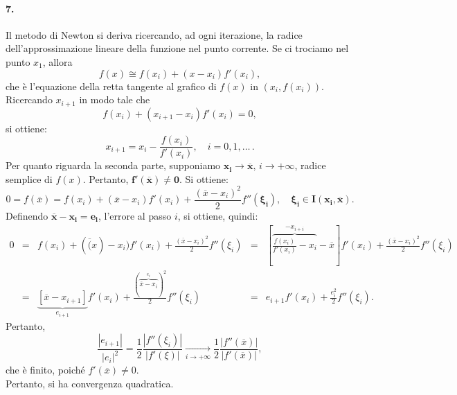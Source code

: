 \paragraph{7.} Il metodo di Newton si deriva ricercando, ad ogni iterazione, la radice dell'approssimazione lineare della funzione nel punto corrente. Se ci trociamo nel punto $x_1$, allora
\begin{equation*}
	f(x)\cong f(x_i)+(x-x_i)f'(x_i),
\end{equation*}
che è l'equazione della retta tangente al grafico di $f(x)$ in $(x_i, f(x_i))$.\\
Ricercando $x_{i+1}$ in modo tale che
\begin{equation*}
	f(x_i)+(x_{i+1}-x_i)f'(x_i)=0,
\end{equation*}
si ottiene:
\begin{equation*}
	x_{i+1}=x_i-\frac{f(x_i)}{f'(x_i)},\quad i=0,1,\hdots\, .
\end{equation*}
Per quanto riguarda la seconda parte, supponiamo $\boldsymbol{x_i\rightarrow\overline{x}},\, i\rightarrow +\infty$, radice semplice di $f(x)$. Pertanto, $\boldsymbol{f'(\overline{x})\neq 0}$. Si ottiene:
\begin{equation*}
	0=f(\overline{x})=f(x_i)+(\overline{x}-x_i)f'(x_i)+\frac{(\overline{x}-x_i)^2}{2}f''(\boldsymbol{\xi_i}),\quad \boldsymbol{\xi_i\in I(x_i,\overline{x})}.
\end{equation*}
Definendo $\boldsymbol{\overline{x}-x_i = e_i}$, l'errore al passo $i$, si ottiene, quindi:
\begin{equation*}
	\begin{matrix}
		0 &=& f(x_i)+(\overline(x)-x_i)f'(x_i)+\frac{(\overline{x}-x_i)^2}{2}f''(\xi_i) &=& \left[\overbrace{\frac{f(x_i)}{f'(x_i)}-x_i}^{-x_{i+i}} - \overline{x}\right]f'(x_i) + \frac{(\overline{x}-x_i)^2}{2} f''(\xi_i)\\
		&=& \underbrace{\left[\overline{x}-x_{i+1}\right]}_{e_{i+1}} f'(x_i) + \frac{(\overbrace{\overline{x}-x_i}^{e_i})^2}{2} f''(\xi_i) &=& e_{i+1} f'(x_i) + \frac{e_i^2}{2} f''(\xi_i).
	\end{matrix}
\end{equation*}
Pertanto,
\begin{equation*}
	\frac{|e_{i+1}|}{|e_i|^2}=\frac{1}{2}\frac{|f''(\xi_i)|}{|f'(\xi)|}\underset{i\rightarrow+\infty}{\longrightarrow}\frac{1}{2}\frac{|f''(\overline{x})|}{|f'(\overline{x})|},
\end{equation*}
che è finito, poiché $f'(\overline{x})\neq 0$.\\
Pertanto, si ha convergenza quadratica.

